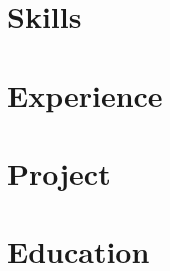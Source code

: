 \documentclass[10pt]{article}
\begin{document}
\pagestyle{others}\thispagestyle{first_page}

\section{Skills}


\section{Experience}


\section{Project}


\section{Education}


% 
\end{document}
